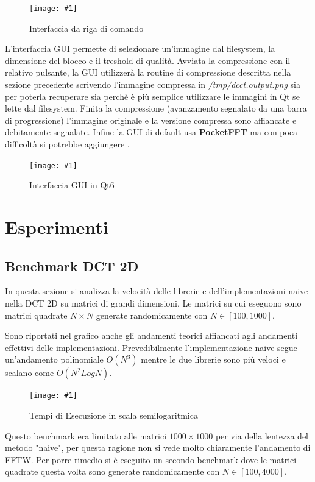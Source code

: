 \documentclass[a4paper,11pt,oneside, table]{article}
\newcommand{\putimage}[4] {
	\begin{figure}[H]
	    \centering
	    \texttt{[image: \#1]}
	    \caption{#2}\label{#3}
	\end{figure}
}
\begin{document}
\putimage{images/interface-cli.png}{Interfaccia da riga di comando}{png:interface_cli}{0.99}

L'interfaccia GUI permette di selezionare un'immagine dal filesystem, la dimensione del blocco e il treshold di qualit\`a.
Avviata la compressione con il relativo pulsante, la GUI utilizzer\`a la routine di compressione descritta nella sezione precedente scrivendo l'immagine compressa in \textit{/tmp/dcct.output.png} sia per poterla recuperare sia perch\`e \`e pi\`u semplice utilizzare le immagini in Qt se lette dal filesystem.
Finita la compressione (avanzamento segnalato da una barra di progressione) l'immagine originale e la versione compressa sono affiancate e debitamente segnalate.
Infine la GUI di default usa \textbf{PocketFFT} ma con poca difficolt\`a si potrebbe aggiungere .

\putimage{images/interface-gui.png}{Interfaccia GUI in Qt6}{png:interface_gui}{0.99}

\newpage

\section{Esperimenti}

\subsection{Benchmark DCT 2D}

In questa sezione si analizza la velocit\`a delle librerie e dell'implementazioni naive nella DCT 2D su matrici di grandi dimensioni.
Le matrici su cui eseguono sono matrici quadrate $N \times N$ generate randomicamente con $N \in [100, 1000]$.

Sono riportati nel grafico anche gli andamenti teorici affiancati agli andamenti effettivi delle implementazioni.
Prevedibilmente l'implementazione naive segue un'andamento polinomiale $O(N^3)$ mentre le due librerie sono pi\`u veloci e scalano come $O(N^2 Log N)$.

\putimage{images/actuator-trends.png}{Tempi di Esecuzione in scala semilogaritmica}{png:actuator-trends}{0.99}

Questo benchmark era limitato alle matrici $1000 \times 1000$ per via della lentezza del metodo "naive", per questa ragione non si vede molto chiaramente l'andamento di FFTW.
Per porre rimedio si \`e eseguito un secondo benchmark dove le matrici quadrate questa volta sono generate randomicamente con $N \in [100, 4000]$.
\end{document}
